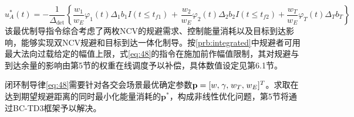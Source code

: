 \begin{equation}
\label{eq:48}
u_A^*(t) =  - \frac{1}{{{\Delta _{\text{det}}}}}\left\{ {\frac{{{w_1}}}{{{w_E}}}{\varphi _1}(t){\Delta _1}{b_1}I(t \leqslant {t_{f1}})} \right.{\text{ + }}\left. {\frac{{{w_2}}}{{{w_E}}}{\varphi _2}(t){\Delta _2}{b_2}I(t \leqslant {t_{f2}}) + \frac{{{w_T}}}{{{w_E}}}{\varphi _T}(t){\Delta _T}{b_T}} \right\}
\end{equation}
该最优制导指令综合考虑了两枚NCV的规避需求、控制能量消耗以及目标到达影响，能够实现双NCV规避和目标到达一体化制导。按\cref{prb:integrated}中规避者可用最大法向过载给定的幅值上限，式\eqref{eq:48}的指令在施加前作幅值限制，其对规避与到达余量的影响由第5节的权重在线调度予以补偿，具体数值设定见第6.1节。

\begin{problem}[制导参数优化]
\label{prb:weights}
闭环制导律\eqref{eq:48}需要针对各交会场景最优确定参数${\mathbf{p}} = {[w,{\kern 1pt} \gamma ,{\kern 1pt} {w_T},{\kern 1pt} {w_E}]^T}$。求取在达到期望规避距离的同时最小化能量消耗的${{\mathbf{p}}^*}$，构成非线性优化问题，第5节将通过BC-TD3框架予以解决。
\end{problem}
